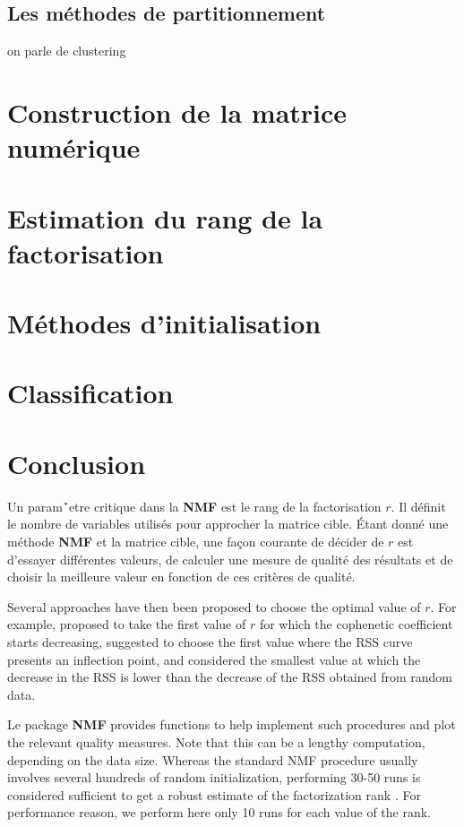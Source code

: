 \documentclass[runningheads]{llncs}
\begin{document}
\subsection{Les m\'ethodes de partitionnement}
on parle de clustering

\section{Construction de la matrice num\'erique}

\section{Estimation du rang de la factorisation}

\section{M\'ethodes d'initialisation}

\section{Classification}

\section{Conclusion}

Un param\'`etre critique dans la \textbf{NMF} est le rang de la factorisation $r$.
Il d\'efinit le nombre de variables utilis\'es pour approcher la matrice cible.
\'Etant donn\'e une m\'ethode \textbf{NMF} et la matrice cible, une façon courante de d\'ecider de $r $ est d'essayer diff\'erentes valeurs, de calculer une mesure de qualit\'e des r\'esultats et de choisir la meilleure valeur en fonction de ces critères de qualit\'e.

Several approaches have then been proposed to choose the optimal value of $r$.
For example, \cite{Brunet2004} proposed to take the first value of $r$ for which the cophenetic coefficient starts decreasing, \cite{Hutchins2008} suggested to choose the first value where the RSS curve presents an inflection point, and \cite{Frigyesi2008} considered the smallest value at which the decrease in the RSS is lower than the decrease of the RSS obtained from random data.

Le package \textbf{NMF} provides functions to help implement such procedures and plot the relevant quality measures.
Note that this can be a lengthy computation, depending on the data size.
Whereas the standard NMF procedure usually involves several hundreds of random initialization, performing 30-50 runs is considered sufficient to get a robust estimate of the factorization rank \cite{Brunet2004, Hutchins2008}.
For performance reason, we perform here only 10 runs for each value of the rank.
\end{document}
